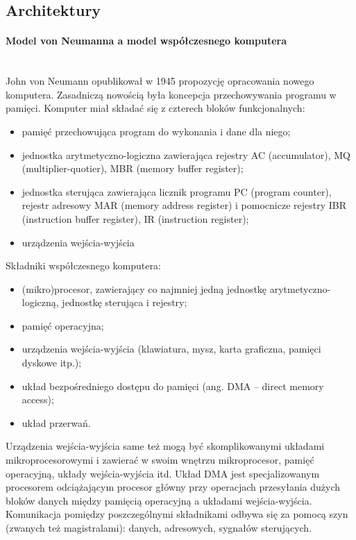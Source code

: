\documentclass[]{report}
\begin{document}
\subsection{Architektury} 
 
\paragraph{Model von Neumanna a model współczesnego komputera\\\\} 
John von Neumann opublikował w 1945 propozycję opracowania nowego komputera. Zasadniczą nowością była
koncepcja przechowywania programu w pamięci. Komputer miał składać się z czterech bloków funkcjonalnych:
\begin{itemize}
\item pamięć przechowująca program do wykonania i dane dla niego;
\item jednostka arytmetyczno-logiczna zawierająca rejestry AC (accumulator), MQ (multiplier-quotier), MBR
(memory buffer register);
\item jednostka sterująca zawierająca licznik programu PC (program counter), rejestr adresowy MAR (memory
address register) i pomocnicze rejestry IBR (instruction buffer register), IR (instruction register);
\item urządzenia wejścia-wyjścia 
\end{itemize}


Składniki współczesnego komputera:
\begin{itemize}
\item (mikro)procesor, zawierający co najmniej jedną jednostkę arytmetyczno-logiczną, jednostkę sterująca i rejestry;
\item pamięć operacyjna;
\item urządzenia wejścia-wyjścia (klawiatura, mysz, karta graficzna, pamięci dyskowe itp.);
\item układ bezpośredniego dostępu do pamięci (ang. DMA – direct memory access);
\item układ przerwań.
\end{itemize}

Urządzenia wejścia-wyjścia same też mogą być skomplikowanymi układami mikroprocesorowymi i zawierać w swoim
wnętrzu mikroprocesor, pamięć operacyjną, układy wejścia-wyjścia itd. Układ DMA jest specjalizowanym procesorem odciążającym procesor główny przy operacjach przesyłania dużych bloków danych między pamięcią operacyjną a układami wejścia-wyjścia. Komunikacja pomiędzy poszczególnymi składnikami odbywa się za
pomocą szyn (zwanych też magistralami): danych, adresowych, sygnałów sterujących.
\end{document}

